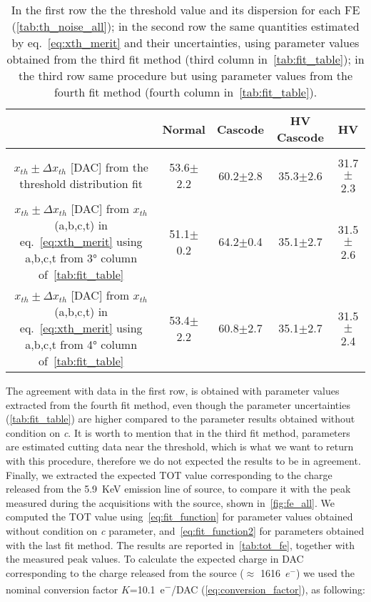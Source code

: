 \begin{table}[h!]
\centering
\begin{tabular}{c|c|c|c|c}
 & \textbf{Normal} & \textbf{Cascode} & \textbf{HV Cascode} & \textbf{HV} \\[.5ex]
\hline
\hline \\[-2.5ex]
\shortstack{\textit{$x_{th}\pm\Delta x_{th}$} [DAC] \\ from the threshold distribution fit} & 53.6$\pm$2.2 & 60.2$\pm$2.8 & 35.3$\pm$2.6 & 31.7$\pm$2.3 \\ [0.5ex]
\hline
\shortstack{\textit{$x_{th}\pm\Delta x_{th}$} [DAC] \\ from $x_{th}$(a,b,c,t) in eq.~\ref{eq:xth_merit}\\ using a,b,c,t from 3° column of~\autoref{tab:fit_table}} & 51.1$\pm$0.2 & 64.2$\pm$0.4 & 35.1$\pm$2.7 & 31.5$\pm$2.6 \\[0.5ex]
\hline
\hline
\shortstack{\textit{$x_{th}\pm\Delta x_{th}$} [DAC] \\ from $x_{th}$(a,b,c,t) in eq.~\ref{eq:xth_merit} \\ using a,b,c,t from 4° column of~\autoref{tab:fit_table}} & 53.4$\pm$2.2 & 60.8$\pm$2.7 & 35.1$\pm$2.7 & 31.5$\pm$2.4 \\[0.5ex]
\hline
\hline
\end{tabular}
\caption{In the first row the the threshold value and its dispersion for each FE (\autoref{tab:th_noise_all}); in the second row the same quantities estimated by eq.~\ref{eq:xth_merit} and their uncertainties, using parameter values obtained from the third fit method (third column in~\autoref{tab:fit_table}); in the third row same procedure but using parameter values from the fourth fit method (fourth column in~\autoref{tab:fit_table}).}
\label{tab:xth}
\end{table}

The agreement with data in the first row, is obtained with parameter values extracted from the fourth fit method, even though the parameter uncertainties (\autoref{tab:fit_table}) are higher compared to the parameter results obtained without condition on \textit{c}. It is worth to mention that in the third fit method, parameters are estimated cutting data near the threshold, which is what we want to return with this procedure, therefore we do not expected the results to be in agreement.\\

Finally, we extracted the expected TOT value corresponding to the charge released from the \SI{5.9}{KeV} emission line of  source, to compare it with the peak measured during the acquisitions with the source, shown in~\autoref{fig:fe_all}. We computed the TOT value using~\autoref{eq:fit_function} for parameter values obtained without condition on \textit{c} parameter, and~\autoref{eq:fit_function2} for parameters obtained with the last fit method. The results are reported in~\autoref{tab:tot_fe}, together with the measured peak values. To calculate the expected charge in DAC corresponding to the charge released from the source ($\approx$ 1616~$e^{-}$) we used the nominal conversion factor $K$=\SI{10.1}{e^{-}/DAC} (\autoref{eq:conversion_factor}), as following:

